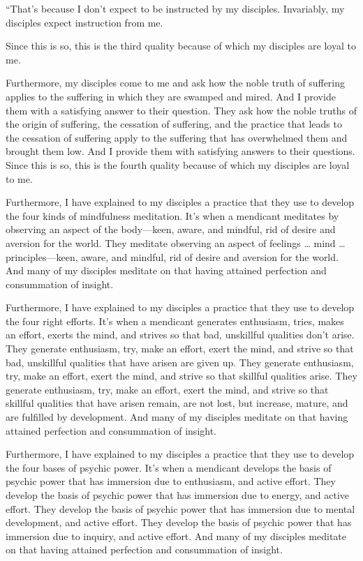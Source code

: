 \documentclass[12pt,openany]{book}%
\begin{document}
“That’s because I don’t expect to be instructed by my disciples. Invariably, my disciples expect instruction from me. 

Since this is so, this is the third quality because of which my disciples are loyal to me. 

Furthermore, my disciples come to me and ask how the noble truth of suffering applies to the suffering in which they are swamped and mired. And I provide them with a satisfying answer to their question. They ask how the noble truths of the origin of suffering, the cessation of suffering, and the practice that leads to the cessation of suffering apply to the suffering that has overwhelmed them and brought them low. And I provide them with satisfying answers to their questions. Since this is so, this is the fourth quality because of which my disciples are loyal to me. 

Furthermore, I have explained to my disciples a practice that they use to develop the four kinds of mindfulness meditation. It’s when a mendicant meditates by observing an aspect of the body—keen, aware, and mindful, rid of desire and aversion for the world. They meditate observing an aspect of feelings … mind … principles—keen, aware, and mindful, rid of desire and aversion for the world. And many of my disciples meditate on that having attained perfection and consummation of insight. 

Furthermore, I have explained to my disciples a practice that they use to develop the four right efforts. It’s when a mendicant generates enthusiasm, tries, makes an effort, exerts the mind, and strives so that bad, unskillful qualities don’t arise. They generate enthusiasm, try, make an effort, exert the mind, and strive so that bad, unskillful qualities that have arisen are given up. They generate enthusiasm, try, make an effort, exert the mind, and strive so that skillful qualities arise. They generate enthusiasm, try, make an effort, exert the mind, and strive so that skillful qualities that have arisen remain, are not lost, but increase, mature, and are fulfilled by development. And many of my disciples meditate on that having attained perfection and consummation of insight. 

Furthermore, I have explained to my disciples a practice that they use to develop the four bases of psychic power. It’s when a mendicant develops the basis of psychic power that has immersion due to enthusiasm, and active effort. They develop the basis of psychic power that has immersion due to energy, and active effort. They develop the basis of psychic power that has immersion due to mental development, and active effort. They develop the basis of psychic power that has immersion due to inquiry, and active effort. And many of my disciples meditate on that having attained perfection and consummation of insight. 
\end{document}
